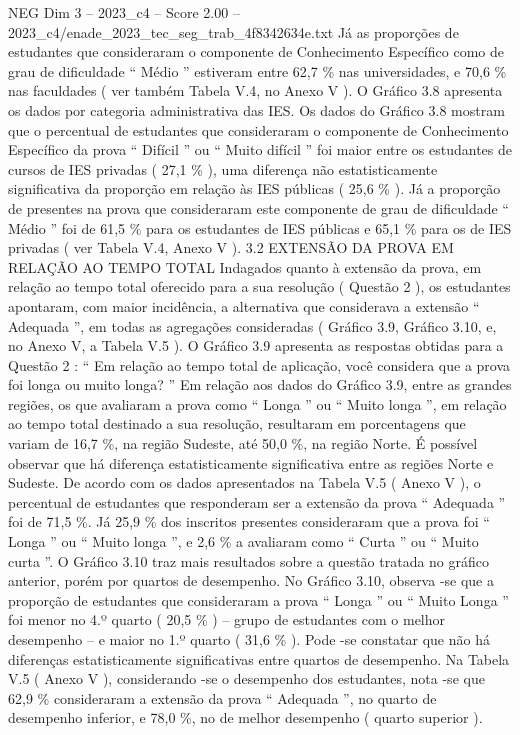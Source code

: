 \begin{textsample}{NEG Dim 3 – 2023\_c4 – Score 2.00 – 2023\_c4/enade\_2023\_tec\_seg\_trab\_4f8342634e.txt}
Já as proporções de estudantes que consideraram o componente de Conhecimento Específico como de grau de dificuldade “ Médio ” estiveram entre 62,7 \% nas universidades, e 70,6 \% nas faculdades ( ver também Tabela V.4, no Anexo V ).
O Gráfico 3.8 apresenta os dados por categoria administrativa das IES.
Os dados do Gráfico 3.8 mostram que o percentual de estudantes que consideraram o componente de Conhecimento Específico da prova “ Difícil ” ou “ Muito difícil ” foi maior entre os estudantes de cursos de IES privadas ( 27,1 \% ), uma diferença não estatisticamente significativa da proporção em relação às IES públicas ( 25,6 \% ).
Já a proporção de presentes na prova que consideraram este componente de grau de dificuldade “ Médio ” foi de 61,5 \% para os estudantes de IES públicas e 65,1 \% para os de IES privadas ( ver Tabela V.4, Anexo V ). 3.2 EXTENSÃO DA PROVA EM RELAÇÃO AO TEMPO TOTAL Indagados quanto à extensão da prova, em relação ao tempo total oferecido para a sua resolução ( Questão 2 ), os estudantes apontaram, com maior incidência, a alternativa que considerava a extensão “ Adequada ”, em todas as agregações consideradas ( Gráfico 3.9, Gráfico 3.10, e, no Anexo V, a Tabela V.5 ).
O Gráfico 3.9 apresenta as respostas obtidas para a Questão 2 : “ Em relação ao tempo total de aplicação, você considera que a prova foi longa ou muito longa? ” Em relação aos dados do Gráfico 3.9, entre as grandes regiões, os que avaliaram a prova como “ Longa ” ou “ Muito longa ”, em relação ao tempo total destinado a sua resolução, resultaram em porcentagens que variam de 16,7 \%, na região Sudeste, até 50,0 \%, na região Norte.
É possível observar que há diferença estatisticamente significativa entre as regiões Norte e Sudeste.
De acordo com os dados apresentados na Tabela V.5 ( Anexo V ), o percentual de estudantes que responderam ser a extensão da prova “ Adequada ” foi de 71,5 \%.
Já 25,9 \% dos inscritos presentes consideraram que a prova foi “ Longa ” ou “ Muito longa ”, e 2,6 \% a avaliaram como “ Curta ” ou “ Muito curta ”.
O Gráfico 3.10 traz mais resultados sobre a questão tratada no gráfico anterior, porém por quartos de desempenho.
No Gráfico 3.10, observa -se que a proporção de estudantes que consideraram a prova “ Longa ” ou “ Muito Longa ” foi menor no 4.º quarto ( 20,5 \% ) – grupo de estudantes com o melhor desempenho – e maior no 1.º quarto ( 31,6 \% ).
Pode -se constatar que não há diferenças estatisticamente significativas entre quartos de desempenho.
Na Tabela V.5 ( Anexo V ), considerando -se o desempenho dos estudantes, nota -se que 62,9 \% consideraram a extensão da prova “ Adequada ”, no quarto de desempenho inferior, e 78,0 \%, no de melhor desempenho ( quarto superior ).

\end{textsample}
